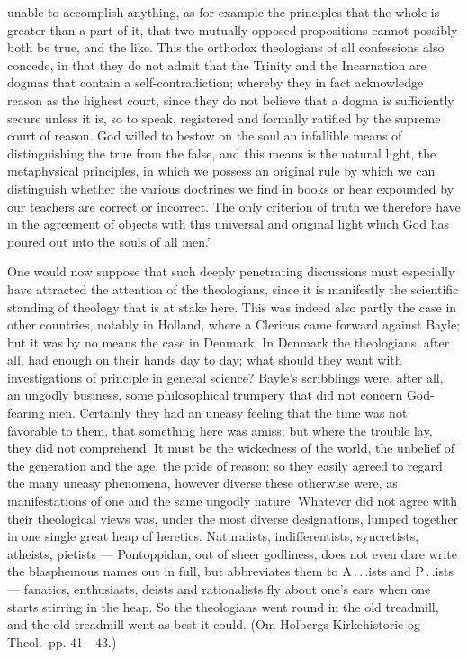 \documentclass[12pt]{book}
\newcommand{\opage}[1]{\marginnote{\footnotesize\textit{[#1]}}}
\begin{document}
unable to accomplish anything, as for example the principles that the whole
is greater than a part of it, that two mutually opposed propositions cannot
possibly both be true, and the like. This the orthodox theologians of all
confessions also concede, in that they do not admit that the Trinity and the
Incarnation are dogmas that contain a self-contradiction; whereby they in
fact acknowledge reason as the highest court, since they do not believe that a
dogma is sufficiently secure unless it is, so to speak, registered and
formally ratified by the supreme court of reason. God willed to bestow on the
soul an infallible means of distinguishing the true from the false, and this
means is the natural light, the metaphysical principles, in which we possess
an original rule by which we can distinguish whether the various doctrines we
find in books or hear expounded by our teachers are correct or incorrect. The
only criterion of truth we therefore have in the agreement of objects with
this universal and original light which God has poured out into the souls of
all men.''

One would now suppose that such deeply penetrating discussions must especially
have attracted the attention of the theologians, since it is manifestly the
scientific standing of theology that is at stake here. This was indeed also
partly the case in other countries, notably in Holland, where a Clericus came
forward against Bayle; but it was by no means the case in Denmark. In Denmark
the theologians, after all, had enough on their hands day to day; what should
they want with investigations of principle in general science?
\opage{270}\setcounter{footnote}{0}%
Bayle's scribblings were, after all, an ungodly business, some philosophical
trumpery that did not concern God-fearing men. Certainly they had an uneasy
feeling that the time was not favorable to them, that something here was
amiss; but where the trouble lay, they did not comprehend. It must be the
wickedness of the world, the unbelief of the generation and the age, the pride
of reason; so they easily agreed to regard the many uneasy phenomena, however
diverse these otherwise were, as manifestations of one and the same ungodly
nature. Whatever did not agree with their theological views was, under the
most diverse designations, lumped together in one single great heap of
heretics. Naturalists, indifferentists, syncretists, atheists, pietists ---
Pontoppidan, out of sheer godliness, does not even dare write the blasphemous
names out in full, but abbreviates them to A\,.\,.\,.ists and P\,.\,.ists ---
fanatics, enthusiasts, deists and rationalists fly about one's ears when one
starts stirring in the heap. So the theologians went round in the old
treadmill, and the old treadmill went as best it could. (Om Holbergs
Kirkehistorie og Theol.\ pp. 41---43.)
\end{document}

